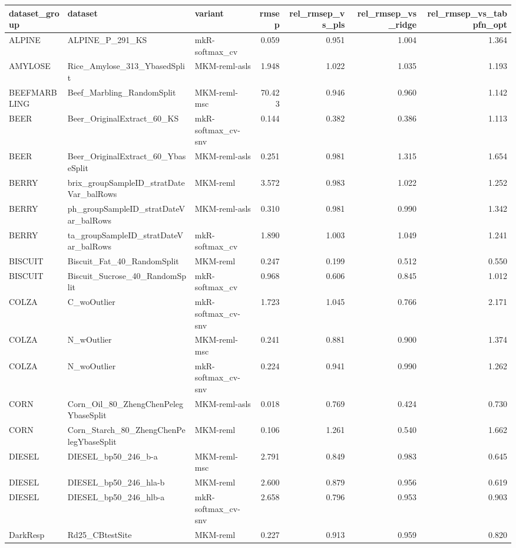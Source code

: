 \begin{tabular}{lllrrrr}
\toprule
dataset_group & dataset & variant & rmsep & rel_rmsep_vs_pls & rel_rmsep_vs_ridge & rel_rmsep_vs_tabpfn_opt \\
\midrule
ALPINE & ALPINE_P_291_KS & mkR-softmax_cv & 0.059 & 0.951 & 1.004 & 1.364 \\
AMYLOSE & Rice_Amylose_313_YbasedSplit & MKM-reml-asls & 1.948 & 1.022 & 1.035 & 1.193 \\
BEEFMARBLING & Beef_Marbling_RandomSplit & MKM-reml-msc & 70.423 & 0.946 & 0.960 & 1.142 \\
BEER & Beer_OriginalExtract_60_KS & mkR-softmax_cv-snv & 0.144 & 0.382 & 0.386 & 1.113 \\
BEER & Beer_OriginalExtract_60_YbaseSplit & MKM-reml-asls & 0.251 & 0.981 & 1.315 & 1.654 \\
BERRY & brix_groupSampleID_stratDateVar_balRows & MKM-reml & 3.572 & 0.983 & 1.022 & 1.252 \\
BERRY & ph_groupSampleID_stratDateVar_balRows & MKM-reml-asls & 0.310 & 0.981 & 0.990 & 1.342 \\
BERRY & ta_groupSampleID_stratDateVar_balRows & mkR-softmax_cv & 1.890 & 1.003 & 1.049 & 1.241 \\
BISCUIT & Biscuit_Fat_40_RandomSplit & MKM-reml & 0.247 & 0.199 & 0.512 & 0.550 \\
BISCUIT & Biscuit_Sucrose_40_RandomSplit & mkR-softmax_cv & 0.968 & 0.606 & 0.845 & 1.012 \\
COLZA & C_woOutlier & mkR-softmax_cv-snv & 1.723 & 1.045 & 0.766 & 2.171 \\
COLZA & N_wOutlier & MKM-reml-msc & 0.241 & 0.881 & 0.900 & 1.374 \\
COLZA & N_woOutlier & mkR-softmax_cv-snv & 0.224 & 0.941 & 0.990 & 1.262 \\
CORN & Corn_Oil_80_ZhengChenPelegYbaseSplit & MKM-reml-asls & 0.018 & 0.769 & 0.424 & 0.730 \\
CORN & Corn_Starch_80_ZhengChenPelegYbaseSplit & MKM-reml & 0.106 & 1.261 & 0.540 & 1.662 \\
DIESEL & DIESEL_bp50_246_b-a & MKM-reml-msc & 2.791 & 0.849 & 0.983 & 0.645 \\
DIESEL & DIESEL_bp50_246_hla-b & MKM-reml & 2.600 & 0.879 & 0.956 & 0.619 \\
DIESEL & DIESEL_bp50_246_hlb-a & mkR-softmax_cv-snv & 2.658 & 0.796 & 0.953 & 0.903 \\
DarkResp & Rd25_CBtestSite & MKM-reml & 0.227 & 0.913 & 0.959 & 0.820 \\

\end{tabular}
